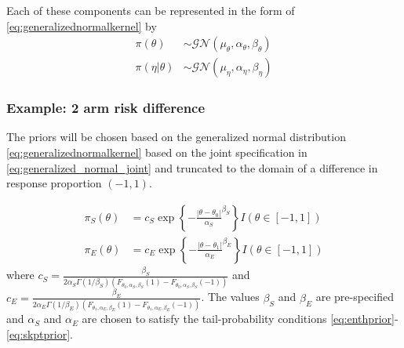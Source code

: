 \documentclass[12pt]{article}
\begin{document}
Each of these components can be represented in the form of \eqref{eq:generalizednormalkernel} by
\begin{align}
\pi(\theta)&\sim\mathcal{GN}(\mu_\theta,\alpha_\theta,\beta_\theta) \label{eq:genNormPlacebo}\\
\pi(\eta|\theta)&\sim\mathcal{GN}(\mu_\eta,\alpha_\eta,\beta_\eta) \label{eq:genNormRd}
\end{align}

\subsubsection{Example: 2 arm risk difference}

The priors will be chosen based on the generalized normal distribution \eqref{eq:generalizednormalkernel} based on the joint specification in \eqref{eq:generalized_normal_joint} and truncated to the domain of a difference in response proportion $(-1, 1)$.

\begin{align*}
\pi_S(\theta)&=c_S \exp\left\{-\frac{|\theta-\theta_0|}{\alpha_S}^{\beta_S}\right\}{I(\theta\in[-1,1])}\\
\pi_E(\theta)&=c_E\exp\left\{-\frac{|\theta-\theta_1|}{\alpha_E}^{\beta_E}\right\}{I(\theta\in[-1,1])}
\end{align*}
where $c_S=\frac{\beta_S}{2\alpha_S \Gamma(1/\beta_S)({F_{\theta_0,\alpha_S,\beta_S}(1)-F_{\theta_0,\alpha_S,\beta_S}(-1)})}$ and $c_E=\frac{\beta_E}{2\alpha_E \Gamma(1/\beta_E)({F_{\theta_1,\alpha_E,\beta_E}(1)-F_{\theta_1,\alpha_E,\beta_E}(-1)})}$. The values $\beta_S$ and $\beta_E$ are pre-specified and $\alpha_S$ and $\alpha_E$ are chosen to satisfy the tail-probability conditions 
\eqref{eq:enthprior}-\eqref{eq:skptprior}.
\end{document}
